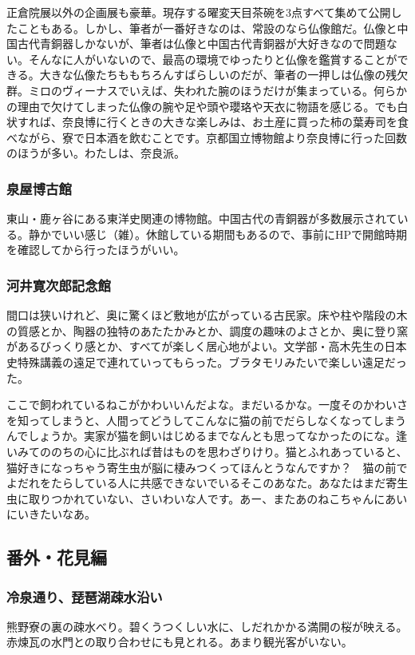 正倉院展以外の企画展も豪華。現存する曜変天目茶碗を3点すべて集めて公開したこともある。しかし、筆者が一番好きなのは、常設のなら仏像館だ。仏像と中国古代青銅器しかないが、筆者は仏像と中国古代青銅器が大好きなので問題ない。そんなに人がいないので、最高の環境でゆったりと仏像を鑑賞することができる。大きな仏像たちももちろんすばらしいのだが、筆者の一押しは仏像の残欠群。ミロのヴィーナスでいえば、失われた腕のほうだけが集まっている。何らかの理由で欠けてしまった仏像の腕や足や頭や瓔珞や天衣に物語を感じる。でも白状すれば、奈良博に行くときの大きな楽しみは、お土産に買った柿の葉寿司を食べながら、寮で日本酒を飲むことです。京都国立博物館より奈良博に行った回数のほうが多い。わたしは、奈良派。

\subsubsection{泉屋博古館}
東山・鹿ヶ谷にある東洋史関連の博物館。中国古代の青銅器が多数展示されている。静かでいい感じ（雑）。休館している期間もあるので、事前にHPで開館時期を確認してから行ったほうがいい。

\subsubsection{河井寛次郎記念館}
間口は狭いけれど、奥に驚くほど敷地が広がっている古民家。床や柱や階段の木の質感とか、陶器の独特のあたたかみとか、調度の趣味のよさとか、奥に登り窯があるびっくり感とか、すべてが楽しく居心地がよい。文学部・高木先生の日本史特殊講義の遠足で連れていってもらった。ブラタモリみたいで楽しい遠足だった。

ここで飼われているねこがかわいいんだよな。まだいるかな。一度そのかわいさを知ってしまうと、人間ってどうしてこんなに猫の前でだらしなくなってしまうんでしょうか。実家が猫を飼いはじめるまでなんとも思ってなかったのにな。逢いみてののちの心に比ぶれば昔はものを思わざりけり。猫とふれあっていると、猫好きになっちゃう寄生虫が脳に棲みつくってほんとうなんですか？　猫の前でよだれをたらしている人に共感できないでいるそこのあなた。あなたはまだ寄生虫に取りつかれていない、さいわいな人です。あー、またあのねこちゃんにあいにいきたいなあ。

\subsection{番外・花見編}
\subsubsection{冷泉通り、琵琶湖疎水沿い}
熊野寮の裏の疎水べり。碧くうつくしい水に、しだれかかる満開の桜が映える。赤煉瓦の水門との取り合わせにも見とれる。あまり観光客がいない。

